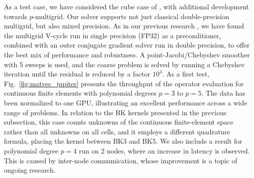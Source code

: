 \documentclass[a4paper,12pt]{article}
\begin{document}
As a test case, we have considered the cube case of
\cite[Sec.~5.1]{KronbichlerLjungkvist2019}, with additional development
towards $p$-multigrid. Our solver supports not just classical double-precision
multigrid, but also mixed precision. As in our previous research
\citep{KronbichlerLjungkvist2019, Fehn2020}, we have found the multigrid V-cycle run
in single precision (FP32) as a preconditioner, combined with an outer conjugate
gradient solver run in double precision, to offer the best mix of performance and robustness. A point-Jacobi/Chebyshev smoother
with 5 sweeps is used, and the coarse problem is solved by running a Chebyshev
iteration until the residual is reduced by a factor $10^3$. As a first test,
Fig.~\ref{fig:matvec_jupiter} presents the throughput of the operator
evaluation for continuous finite elements with polynomial degrees $p=3$ to
$p=5$. The data has been normalized to one GPU, illustrating an excellent
performance across a wide range of problems. In relation to the BK kernels
presented in the previous subsection, this case counts unknowns of the
continuous finite-element space rather than all unknowns on all cells, and it
employs a different quadrature formula, placing the kernel between BK3 and
BK5. We also include a result for
polynomial degree $p=4$ run on 2 nodes, where an increase in latency is
observed. This is caused by inter-node communication, whose improvement is a
topic of ongoing research.
\end{document}
